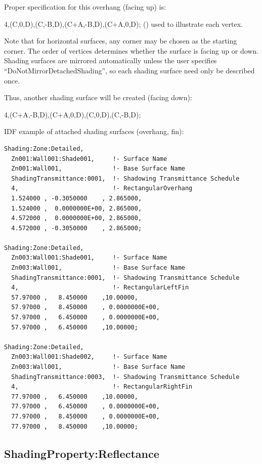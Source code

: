 Proper specification for this overhang (facing up) is:

4,(C,0,D),(C,-B,D),(C+A,-B,D),(C+A,0,D); () used to illustrate each vertex.

\begin{callout}
Note that for horizontal surfaces, any corner may be chosen as the starting corner. The order of vertices determines whether the surface is facing up or down. Shading surfaces are mirrored automatically unless the user specifies ``DoNotMirrorDetachedShading'', so each shading surface need only be described once.
\end{callout}

Thus, another shading surface will be created (facing down):

4,(C+A,-B,D),(C+A,0,D),(C,0,D),(C,-B,D);

IDF example of attached shading surfaces (overhang, fin):

\begin{lstlisting}
Shading:Zone:Detailed,
  Zn001:Wall001:Shade001,     !- Surface Name
  Zn001:Wall001,              !- Base Surface Name
  ShadingTransmittance:0001,  !- Shadowing Transmittance Schedule
  4,                          !- RectangularOverhang
  1.524000 , -0.3050000    , 2.865000,
  1.524000 ,  0.0000000E+00, 2.865000,
  4.572000 ,  0.0000000E+00, 2.865000,
  4.572000 , -0.3050000    , 2.865000;

Shading:Zone:Detailed,
  Zn003:Wall001:Shade001,     !- Surface Name
  Zn003:Wall001,              !- Base Surface Name
  ShadingTransmittance:0001,  !- Shadowing Transmittance Schedule
  4,                          !- RectangularLeftFin
  57.97000 ,   8.450000    ,10.00000,
  57.97000 ,   8.450000    , 0.0000000E+00,
  57.97000 ,   6.450000    , 0.0000000E+00,
  57.97000 ,   6.450000    ,10.00000;

Shading:Zone:Detailed,
  Zn003:Wall001:Shade002,     !- Surface Name
  Zn003:Wall001,              !- Base Surface Name
  ShadingTransmittance:0003,  !- Shadowing Transmittance Schedule
  4,                          !- RectangularRightFin
  77.97000 ,   6.450000    ,10.00000,
  77.97000 ,   6.450000    , 0.0000000E+00,
  77.97000 ,   8.450000    , 0.0000000E+00,
  77.97000 ,   8.450000    ,10.00000;
\end{lstlisting}

\subsection{ShadingProperty:Reflectance}\label{shadingpropertyreflectance}

